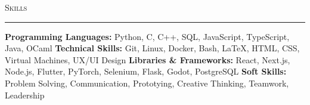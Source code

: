 \documentclass[11pt,letterpaper]{article}
\begin{document}
\vspace{4pt}
\textsc{\large{Skills}} 
\vspace{4pt}
\hrule
\begin{list}{}{\setlength{\leftmargin}{1em}\setlength{\rightmargin}{2pt}}
  
    \item
          \small{\textbf{Programming Languages:} Python, C, C++, SQL, JavaScript, TypeScript, Java, OCaml}
          \vspace{2pt} \newline
          \small{\textbf{Technical Skills:} Git, Linux, Docker, Bash, LaTeX, HTML, CSS, Virtual Machines, UX/UI Design}
          \vspace{2pt} \newline
          \small{\textbf{Libraries \& Frameworks:} React, Next.js, Node.js, Flutter, PyTorch, Selenium, Flask, Godot, PostgreSQL}
          \vspace{2pt} \newline
          \small{\textbf{Soft Skills:} Problem Solving, Communication, Prototying, Creative Thinking, Teamwork, Leadership}
          \vspace{0pt}
\end{list}




              
\end{document}
